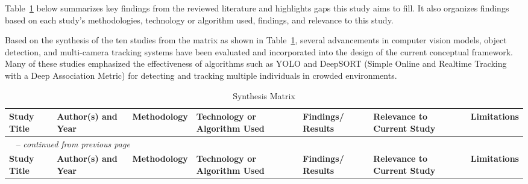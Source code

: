 {Table~\ref{tab:related-studies} below summarizes key findings from the reviewed literature and highlights gaps this study aims to fill. It also organizes findings based on each study’s methodologies, technology or algorithm used, findings, and relevance to this study.

Based on the synthesis of the ten studies from the matrix as shown in Table~\ref{tab:related-studies}, several advancements in computer vision models, object detection, and multi-camera tracking systems \citep{Xie2024,Amosa2023} have been evaluated and incorporated into the design of the current conceptual framework. Many of these studies emphasized the effectiveness of algorithms such as YOLO  \citep{Chen2022,Erlina2023} and DeepSORT (Simple Online and Realtime Tracking with a Deep Association Metric) \citep{Li2023} for detecting and tracking multiple individuals in crowded environments.

\begin{landscape}  %
	\setlength{\LTpre}{0pt}      %
	\setlength{\LTpost}{0pt}     %
	
	\setcounter{rowcount}{0}
	
	\begin{longtable}{|p{2.5cm}|p{2.5cm}|p{2.7cm}|p{2.7cm}|p{2.5cm}|p{2.5cm}|p{2.5cm}|}  %
		\caption[Synthesis Matrix]{\newline \newline Synthesis Matrix} \label{tab:related-studies} \\
		
		\hline 
		\textbf{Study Title} & \textbf{Author(s) and Year} & \textbf{Methodology} & \textbf{Technology or Algorithm Used} & \textbf{Findings/ Results} & \textbf{Relevance to Current Study} & \textbf{Limitations} \\ 
		\hline 
		\endfirsthead
		
		\multicolumn{7}{l}{{\tablename\ \thetable{} -- \textit{continued from previous page}}} \\
		\hline
		\textbf{Study Title} & \textbf{Author(s) and Year} & \textbf{Methodology} & \textbf{Technology or Algorithm Used} & \textbf{Findings/ Results} & \textbf{Relevance to Current Study} & \textbf{Limitations} \\ 
		\hline 
		\endhead
		

\end{longtable}
\end{landscape}}
